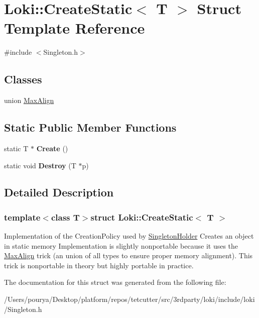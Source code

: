 \hypertarget{structLoki_1_1CreateStatic}{}\section{Loki\+:\+:Create\+Static$<$ T $>$ Struct Template Reference}
\label{structLoki_1_1CreateStatic}


{\ttfamily \#include $<$Singleton.\+h$>$}

\subsection*{Classes}
\begin{DoxyCompactItemize}
\item 
union \hyperlink{unionLoki_1_1CreateStatic_1_1MaxAlign}{Max\+Align}
\end{DoxyCompactItemize}
\subsection*{Static Public Member Functions}
\begin{DoxyCompactItemize}
\item 
\hypertarget{structLoki_1_1CreateStatic_ae6e4d0e1496c78a0ac48f196cf0bad07}{}static T $\ast$ {\bfseries Create} ()\label{structLoki_1_1CreateStatic_ae6e4d0e1496c78a0ac48f196cf0bad07}

\item 
\hypertarget{structLoki_1_1CreateStatic_a3566e40a9f08d7756c50a31f5b0f148f}{}static void {\bfseries Destroy} (T $\ast$p)\label{structLoki_1_1CreateStatic_a3566e40a9f08d7756c50a31f5b0f148f}

\end{DoxyCompactItemize}


\subsection{Detailed Description}
\subsubsection*{template$<$class T$>$struct Loki\+::\+Create\+Static$<$ T $>$}

Implementation of the Creation\+Policy used by \hyperlink{classLoki_1_1SingletonHolder}{Singleton\+Holder} Creates an object in static memory Implementation is slightly nonportable because it uses the \hyperlink{unionLoki_1_1CreateStatic_1_1MaxAlign}{Max\+Align} trick (an union of all types to ensure proper memory alignment). This trick is nonportable in theory but highly portable in practice. 

The documentation for this struct was generated from the following file\+:\begin{DoxyCompactItemize}
\item 
/\+Users/pourya/\+Desktop/platform/repos/tetcutter/src/3rdparty/loki/include/loki/Singleton.\+h\end{DoxyCompactItemize}

